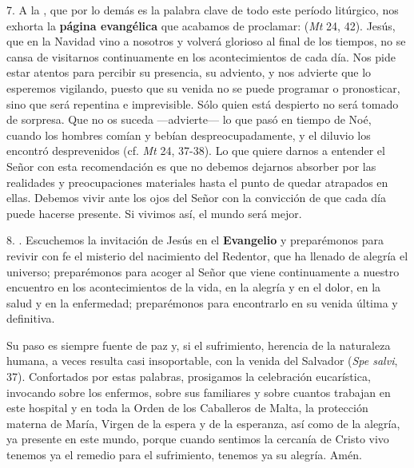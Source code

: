 7. A la , que por lo demás es la palabra clave de todo este período litúrgico, nos exhorta la \textbf{página evangélica} que acabamos de proclamar:  (\emph{Mt} 24, 42). Jesús, que en la Navidad vino a nosotros y volverá glorioso al final de los tiempos, no se cansa de visitarnos continuamente en los acontecimientos de cada día. Nos pide estar atentos para percibir su presencia, su adviento, y nos advierte que lo esperemos vigilando, puesto que su venida no se puede programar o pronosticar, sino que será repentina e imprevisible. Sólo quien está despierto no será tomado de sorpresa. Que no os suceda ---advierte--- lo que pasó en tiempo de Noé, cuando los hombres comían y bebían despreocupadamente, y el diluvio los encontró desprevenidos (cf. \emph{Mt} 24, 37-38). Lo que quiere darnos a entender el Señor con esta recomendación es que no debemos dejarnos absorber por las realidades y preocupaciones materiales hasta el punto de quedar atrapados en ellas. Debemos vivir ante los ojos del Señor con la convicción de que cada día puede hacerse presente. Si vivimos así, el mundo será mejor.

8. . Escuchemos la invitación de Jesús en el \textbf{Evangelio} y preparémonos para revivir con fe el misterio del nacimiento del Redentor, que ha llenado de alegría el universo; preparémonos para acoger al Señor que viene continuamente a nuestro encuentro en los acontecimientos de la vida, en la alegría y en el dolor, en la salud y en la enfermedad; preparémonos para encontrarlo en su venida última y definitiva.

Su paso es siempre fuente de paz y, si el sufrimiento, herencia de la naturaleza humana, a veces resulta casi insoportable, con la venida del Salvador  (\emph{Spe salvi}, 37). Confortados por estas palabras, prosigamos la celebración eucarística, invocando sobre los enfermos, sobre sus familiares y sobre cuantos trabajan en este hospital y en toda la Orden de los Caballeros de Malta, la protección materna de María, Virgen de la espera y de la esperanza, así como de la alegría, ya presente en este mundo, porque cuando sentimos la cercanía de Cristo vivo tenemos ya el remedio para el sufrimiento, tenemos ya su alegría. Amén.

\protect\hypertarget{_Toc448662715}{}{\protect\hypertarget{_Toc448690234}{}{\protect\hypertarget{_Toc448708257}{}{\protect\hypertarget{_Toc448709343}{}{\protect\hypertarget{_Toc449554345}{}{}}}}}

